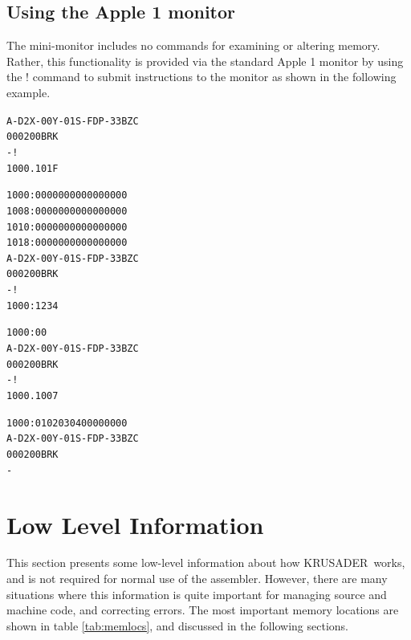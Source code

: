 \documentclass[12pt]{article}
\newcommand{\replica}[1]{\textsf{#1}}
\newcommand{\krusader}{\textsf{KRUSADER}}
\begin{document}
\subsection{Using the Apple 1 monitor}
\label{sec:wozmon}

The mini-monitor includes no commands for examining or altering memory.
Rather, this functionality is provided via the standard Apple 1 monitor
by using the \replica{!} command to submit instructions to the monitor 
as shown in the following example.
\begin{alltt}
A-D2 X-00 Y-01 S-FD P-33 BZC
0002   00          BRK
-!
1000.101F

1000: 00 00 00 00 00 00 00 00
1008: 00 00 00 00 00 00 00 00
1010: 00 00 00 00 00 00 00 00
1018: 00 00 00 00 00 00 00 00
A-D2 X-00 Y-01 S-FD P-33 BZC
0002   00          BRK
-!
1000:1 2 3 4

1000: 00
A-D2 X-00 Y-01 S-FD P-33 BZC
0002   00          BRK
-!
1000.1007

1000: 01 02 03 04 00 00 00 00
A-D2 X-00 Y-01 S-FD P-33 BZC
0002   00          BRK
-
\end{alltt}
\clearpage

\section{Low Level Information}

This section presents some low-level information about how \krusader\ works,
and is not required for normal use of the assembler.  However, there are many situations
where this information is quite important for managing source and machine code, and correcting
errors.  The most important memory locations are shown in table \ref{tab:memlocs}, 
and discussed in the following sections.
\end{document}
